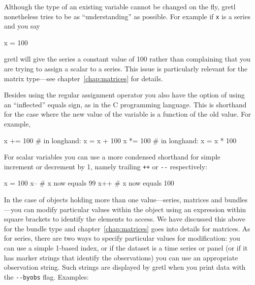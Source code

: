 
Although the type of an existing variable cannot be changed on the
fly, gretl nonetheless tries to be as ``understanding'' as
possible. For example if \texttt{x} is a series and you say

\begin{code}
x = 100
\end{code} 

gretl will give the series a constant value of 100 rather than
complaining that you are trying to assign a scalar to a series. This
issue is particularly relevant for the matrix type---see
chapter~\ref{chap:matrices} for details.

Besides using the regular assignment operator you also have the option
of using an ``inflected'' equals sign, as in the C programming
language. This is shorthand for the case where the new value of the
variable is a function of the old value. For example,

\begin{code}
x += 100 # in longhand: x = x + 100
x *= 100 # in longhand: x = x * 100
\end{code} 

For scalar variables you can use a more condensed shorthand for simple
increment or decrement by 1, namely trailing \texttt{++} or \verb|--|
respectively:

\begin{code}
x = 100
x--     # x now equals 99
x++     # x now equals 100
\end{code}

In the case of objects holding more than one value---series, matrices
and bundles---you can modify particular values within the object using
an expression within square brackets to identify the elements to
access. We have discussed this above for the bundle type and
chapter~\ref{chap:matrices} goes into details for matrices. As for
series, there are two ways to specify particular values for
modification: you can use a simple 1-based index, or if the dataset is
a time series or panel (or if it has marker strings that identify the
observations) you can use an appropriate observation string. Such
strings are displayed by gretl when you print data with the
\verb|--byobs| flag. Examples:

